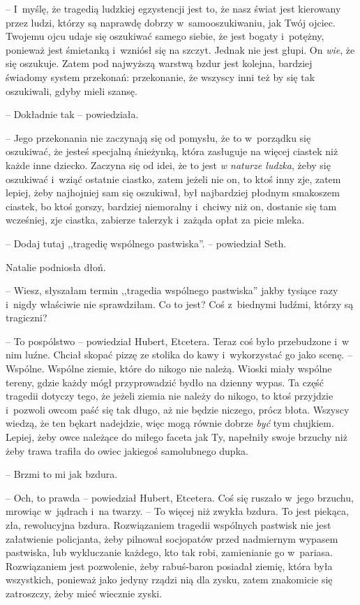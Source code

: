 \documentclass[oneside,polish,11pt,sfheadings]{mwbk}
\begin{document}
-- I~myślę, że tragedią ludzkiej egzystencji jest to, że nasz świat jest
kierowany przez ludzi, którzy są naprawdę dobrzy w~samooszukiwaniu, jak
Twój ojciec. Twojemu ojcu udaje się oszukiwać samego siebie, że jest
bogaty i~potężny, ponieważ jest śmietanką i~wzniósł się na szczyt.
Jednak nie jest głupi. On \textit{wie}, że się oszukuje. Zatem pod
najwyższą warstwą bzdur jest kolejna, bardziej świadomy system
przekonań: przekonanie, że wszyscy inni też by się tak oszukiwali, gdyby
mieli szansę.

-- Dokładnie tak -- powiedziała.

-- Jego przekonania nie zaczynają się od pomysłu, że to w~porządku się
oszukiwać, że jesteś specjalną śnieżynką, która zasługuje na więcej
ciastek niż każde inne dziecko. Zaczyna się od idei, że to jest \textit{w
naturze ludzka}, żeby się oszukiwać i~wziąć ostatnie ciastko, zatem
jeżeli nie on, to ktoś inny zje, zatem lepiej, żeby najhojniej sam się
oszukiwał, był najbardziej płodnym smakoszem ciastek, bo ktoś gorszy,
bardziej niemoralny i~chciwy niż on, dostanie się tam wcześniej, zje
ciastka, zabierze talerzyk i~zażąda opłat za picie mleka.

-- Dodaj tutaj ,,tragedię wspólnego pastwiska''. -- powiedział Seth.

Natalie podniosła dłoń. 

-- Wiesz, słyszałam termin ,,tragedia wspólnego
pastwiska'' jakby tysiące razy i~nigdy właściwie nie sprawdziłam. Co to
jest? Coś z~biednymi ludźmi, którzy są tragiczni?

-- To pospólstwo -- powiedział Hubert, Etcetera. Teraz coś było
przebudzone i~w nim luźne. Chciał skopać pizzę ze stolika do kawy i~wykorzystać go jako scenę. -- Wspólne. Wspólne ziemie, które do nikogo
nie należą. Wioski miały wspólne tereny, gdzie każdy mógł przyprowadzić
bydło na dzienny wypas. Ta część tragedii dotyczy tego, że jeżeli ziemia
nie należy do nikogo, to ktoś przyjdzie i~pozwoli owcom paść się tak
długo, aż nie będzie niczego, prócz błota. Wszyscy wiedzą, że ten bękart
nadejdzie, więc mogą równie dobrze \textit{być} tym chujkiem. Lepiej, żeby
owce należące do miłego faceta jak Ty, napełniły swoje brzuchy niż żeby
trawa trafiła do owiec jakiegoś samolubnego dupka.

-- Brzmi to mi jak bzdura.

-- Och, to prawda -- powiedział Hubert, Etcetera. Coś się ruszało w~jego
brzuchu, mrowiąc w~jądrach i~na twarzy. -- To więcej niż zwykła bzdura.
To jest piekąca, zła, rewolucyjna bzdura. Rozwiązaniem tragedii
wspólnych pastwisk nie jest załatwienie policjanta, żeby pilnował
socjopatów przed nadmiernym wypasem pastwiska, lub wykluczanie każdego,
kto tak robi, zamienianie go w~pariasa. Rozwiązaniem jest pozwolenie,
żeby rabuś-baron posiadał ziemię, która była wszystkich, ponieważ jako
jedyny rządzi nią dla zysku, zatem znakomicie się zatroszczy, żeby mieć
wiecznie zyski.
\end{document}
